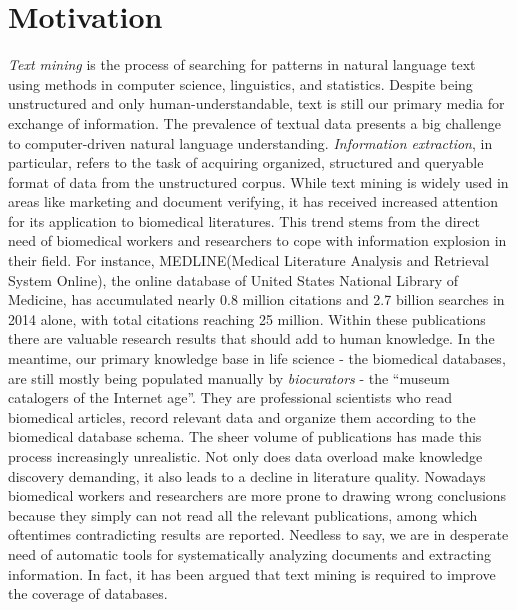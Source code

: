 \section{Motivation}\label{section1.1} %
\emph{Text mining} is the process of searching for patterns in natural language text using methods in computer science, linguistics, and statistics. Despite being unstructured and only human-understandable, text is still our primary media for exchange of information\cite{witten2005text}. The prevalence of textual data presents a big challenge to computer-driven natural language understanding. \emph{Information extraction}, in particular, refers to the task of acquiring organized, structured and queryable format of data from the unstructured corpus. \newline\newline
While text mining is widely used in areas like marketing and document verifying, it has received increased attention for its application to biomedical literatures\cite{kim2003genia,ananiadou2006text,krallinger2005text}. This trend stems from the direct need of biomedical workers and researchers to cope with information explosion in their field. For instance, MEDLINE(Medical Literature Analysis and Retrieval System Online), the online database of United States National Library of Medicine, has accumulated nearly 0.8 million citations and 2.7 billion searches in 2014 alone\cite{MEDLINE:2015:Online}, with total citations reaching 25 million. Within these publications there are valuable research results that should add to human knowledge. In the meantime,  our primary knowledge base in life science - the biomedical databases, are still mostly being populated manually by \emph{biocurators} - the ``museum catalogers of the Internet age''\cite{wiki:biocurators}. They are professional scientists who read biomedical articles, record relevant data and organize them according to the biomedical database schema. The sheer volume of publications has made this process increasingly unrealistic\cite{cohen2005survey}.\newline\newline
Not only does data overload make knowledge discovery demanding, it also leads to a decline in literature quality. Nowadays biomedical workers and researchers are more prone to drawing wrong conclusions because they simply can not read all the relevant publications, among which oftentimes contradicting results are reported. Needless to say, we are in desperate need of automatic tools for systematically analyzing documents and extracting information. In fact, it has been argued that text mining is required to improve the coverage of databases\cite{baumgartner2007manual}.

